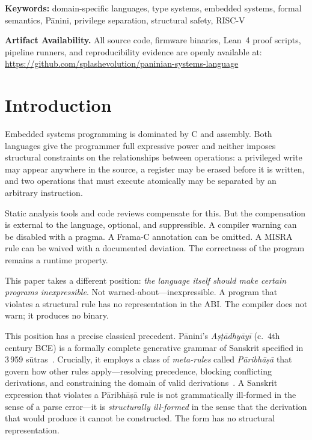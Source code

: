 \documentclass[11pt,a4paper]{article}
\begin{document}
\noindent\textbf{Keywords:} domain-specific languages, type systems, embedded systems,
          formal semantics, P\={a}nini, privilege separation,
          structural safety, RISC-V

\medskip
\noindent\textbf{Artifact Availability.}
All source code, firmware binaries, Lean~4 proof scripts, pipeline runners,
and reproducibility evidence are openly available at:\\
\url{https://github.com/splashevolution/paninian-systems-language}

\bigskip

\section{Introduction}
\label{sec:intro}

Embedded systems programming is dominated by C and assembly. Both languages
give the programmer full expressive power and neither imposes structural
constraints on the relationships between operations: a privileged write may
appear anywhere in the source, a register may be erased before it is written,
and two operations that must execute atomically may be separated by an
arbitrary instruction.

Static analysis tools and code reviews compensate for this. But the
compensation is external to the language, optional, and suppressible.
A compiler warning can be disabled with a pragma. A Frama-C annotation can
be omitted. A MISRA rule can be waived with a documented deviation.
The correctness of the program remains a runtime property.

This paper takes a different position: \emph{the language itself should make
certain programs inexpressible}. Not warned-about---inexpressible. A program
that violates a structural rule has no representation in the ABI. The compiler
does not warn; it produces no binary.

This position has a precise classical precedent. P\={a}nini's
\emph{A\d{s}\d{t}\={a}dhy\={a}y\={i}} (c.\ 4th century BCE) is a
formally complete generative grammar of Sanskrit specified in 3\,959
s\={u}tras~\cite{panini-katre}. Crucially, it employs a class of
\emph{meta-rules} called \emph{P\={a}ribh\={a}\d{s}\={a}} that govern how
other rules apply---resolving precedence, blocking conflicting derivations, and
constraining the domain of valid derivations~\cite{cardona1988panini}. A
Sanskrit expression that violates a P\={a}ribh\={a}\d{s}\={a} rule is not
grammatically ill-formed in the sense of a parse error---it is
\emph{structurally ill-formed} in the sense that the derivation that would
produce it cannot be constructed. The form has no structural representation.
\end{document}
